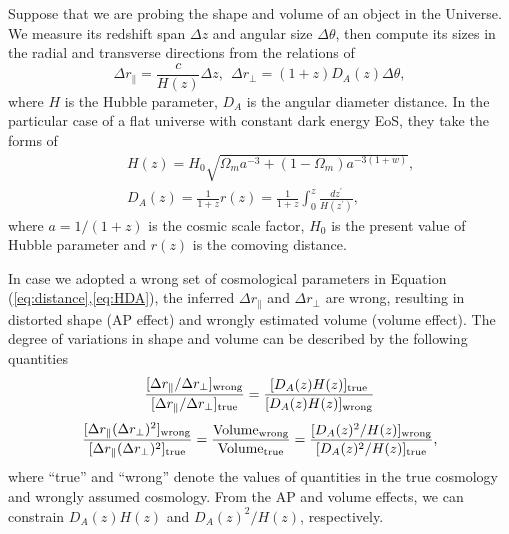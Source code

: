 \documentclass[useAMS,usenatbib]{mn2e}
\begin{document}
Suppose that we are probing the shape and volume of an object in the Universe.
We measure its redshift span $\Delta z$ and angular size $\Delta \theta$,
then compute its sizes in the radial and transverse directions from the relations of 
\begin{equation}\label{eq:distance}
\Delta r_{\parallel} = \frac{c}{H(z)}\Delta z,\ \ \Delta r_{\bot}=(1+z)D_A(z)\Delta \theta,
\end{equation}
where $H$ is the Hubble parameter, $D_A$ is the angular diameter distance.
In the particular case of a flat universe with constant dark energy EoS, they take the forms of
\begin{eqnarray}\label{eq:HDA}
& &H(z) = H_0\sqrt{\Omega_ma^{-3}+(1-\Omega_m)a^{-3(1+w)}},\nonumber\\
& &D_A(z) = \frac{1}{1+z}r(z)=\frac{1}{1+z}\int_0^z \frac{dz^\prime}{H(z^\prime)},
\end{eqnarray}
where $a=1/(1+z)$ is the cosmic scale factor,
$H_0$ is the present value of Hubble parameter and $r(z)$ is the comoving distance.

In case we adopted a wrong set of cosmological parameters in Equation (\ref{eq:distance},\ref{eq:HDA}),
the inferred $\Delta r_{\parallel}$ and $\Delta r_{\bot}$ are wrong,
resulting in distorted shape (AP effect) and wrongly estimated volume (volume effect).
The degree of variations in shape and volume can be described by the following quantities
\begin{equation}\label{eq:stretch}
 \frac{[\Delta r_{\parallel}/\Delta r_{\perp}]_{\rm wrong}}{[\Delta r_{\parallel}/\Delta r_{\perp}]_{\rm true}} =
  \frac{[D_A(z)H(z)]_{\rm true}}{[D_A(z)H(z)]_{\rm wrong}} 
\end{equation}
\begin{equation}\label{eq:volume}
 \frac{[\Delta r_{\parallel}(\Delta r_{\perp})^{2}]_{\rm wrong}}{[\Delta r_{\parallel}(\Delta r_{\perp})^{2}]_{\rm true}}
 = \frac{{\rm Volume}_{\rm wrong}}{{\rm Volume}_{\rm true}}
 = \frac{[D_A(z)^2/H(z)]_{\rm wrong}}{[D_A(z)^2 / H(z)]_{\rm true}},
\end{equation}
where ``true'' and ``wrong'' denote the values of quantities in the true cosmology and wrongly assumed cosmology.
From the AP and volume effects, we can constrain  $D_A(z)H(z)$ and $D_A(z)^2 / H(z)$, respectively.
\end{document}
